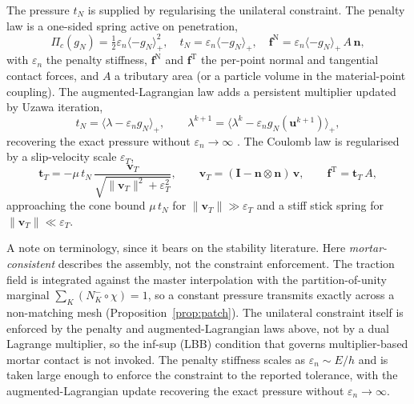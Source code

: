 \documentclass{svjour3}                 %
\newcommand{\norm}[1]{\lVert#1\rVert}
\newcommand{\nbf}{\bm{n}}
\newcommand{\tbf}{\bm{t}}
\newcommand{\ubf}{\bm{u}}
\newcommand{\fbf}{\bm{f}}
\newcommand{\vbf}{\bm{v}}
\newcommand{\gn}{g_{\scriptscriptstyle N}}
\newcommand{\pos}[1]{\langle #1\rangle_{+}}
\begin{document}
The pressure $t_N$ is supplied by regularising the unilateral constraint. The penalty law is a one-sided
spring active on penetration,
\begin{equation}\label{eq:penalty}
\Pi_c(\gn)=\tfrac12\varepsilon_n\pos{-\gn}^2,\quad
t_N=\varepsilon_n\pos{-\gn},\quad
\fbf^{\mathrm N}=\varepsilon_n\pos{-\gn}\,A\,\nbf ,
\end{equation}
with $\varepsilon_n$ the penalty stiffness, $\fbf^{\mathrm N}$ and $\fbf^{\mathrm T}$ the per-point normal and
tangential contact forces, and $A$ a tributary area (or a particle volume in the material-point coupling). The augmented-Lagrangian law adds a persistent multiplier updated by Uzawa
iteration,
\begin{equation}\label{eq:al-pressure}
t_N=\pos{\lambda-\varepsilon_n\gn},\qquad
\lambda^{k+1}=\pos{\lambda^{k}-\varepsilon_n\gn(\ubf^{k+1})},
\end{equation}
recovering the exact pressure without $\varepsilon_n\to\infty$ \citep{alart1991mixed,simo1992augmented,
laursen2002computational}. The Coulomb law is regularised by a slip-velocity scale $\varepsilon_T$,
\begin{equation}\label{eq:friction-reg}
\tbf_T=-\mu\,t_N\,\frac{\vbf_T}{\sqrt{\norm{\vbf_T}^2+\varepsilon_T^2}},\qquad
\vbf_T=(\bm I-\nbf\otimes\nbf)\,\vbf ,\qquad
\fbf^{\mathrm T}=\tbf_T\,A ,
\end{equation}
approaching the cone bound $\mu\,t_N$ for $\norm{\vbf_T}\gg\varepsilon_T$ and a stiff stick
spring for $\norm{\vbf_T}\ll\varepsilon_T$.

A note on terminology, since it bears on the stability literature. Here
\emph{mortar-consistent} describes the assembly, not the constraint enforcement. The traction field is
integrated against the master interpolation with the partition-of-unity marginal $\sum_K(N_K^-\!\circ\chi)=1$, so
a constant pressure transmits exactly across a non-matching mesh (Proposition~\ref{prop:patch}). The unilateral
constraint itself is enforced by the penalty and augmented-Lagrangian laws above, not by a dual Lagrange
multiplier, so the inf-sup (LBB) condition that governs multiplier-based mortar contact
\citep{wohlmuth2011variational} is not invoked. The penalty stiffness scales as $\varepsilon_n\sim E/h$ and is
taken large enough to enforce the constraint to the reported tolerance, with the augmented-Lagrangian update
recovering the exact pressure without $\varepsilon_n\to\infty$.
\end{document}
